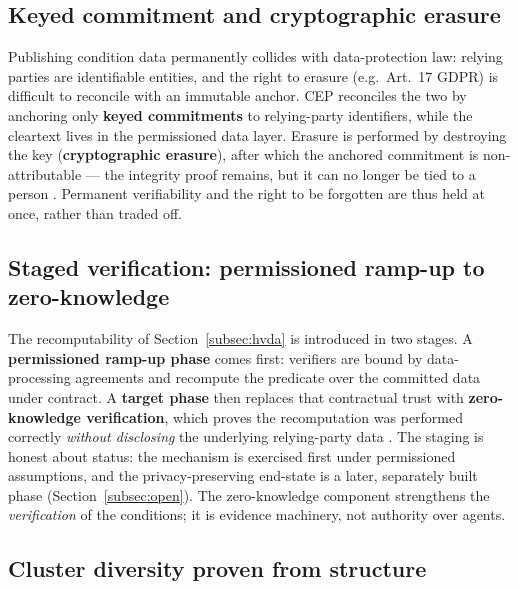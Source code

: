 \subsection{Keyed commitment and cryptographic erasure}
\label{subsec:erasure}

Publishing condition data permanently collides with data-protection law: relying parties are identifiable entities, and the right to erasure (e.g.\ Art.~17 GDPR) is difficult to reconcile with an immutable anchor. CEP reconciles the two by anchoring only \textbf{keyed commitments} to relying-party identifiers, while the cleartext lives in the permissioned data layer. Erasure is performed by destroying the key (\textbf{cryptographic erasure}), after which the anchored commitment is non-attributable — the integrity proof remains, but it can no longer be tied to a person \cite{ref28_techspec}. Permanent verifiability and the right to be forgotten are thus held at once, rather than traded off.

\subsection{Staged verification: permissioned ramp-up to zero-knowledge}
\label{subsec:staged}

The recomputability of Section~\ref{subsec:hvda} is introduced in two stages. A \textbf{permissioned ramp-up phase} comes first: verifiers are bound by data-processing agreements and recompute the predicate over the committed data under contract. A \textbf{target phase} then replaces that contractual trust with \textbf{zero-knowledge verification}, which proves the recomputation was performed correctly \emph{without disclosing} the underlying relying-party data \cite{ref28_techspec}. The staging is honest about status: the mechanism is exercised first under permissioned assumptions, and the privacy-preserving end-state is a later, separately built phase (Section~\ref{subsec:open}). The zero-knowledge component strengthens the \emph{verification} of the conditions; it is evidence machinery, not authority over agents.

\subsection{Cluster diversity proven from structure}
\label{subsec:clusters}

